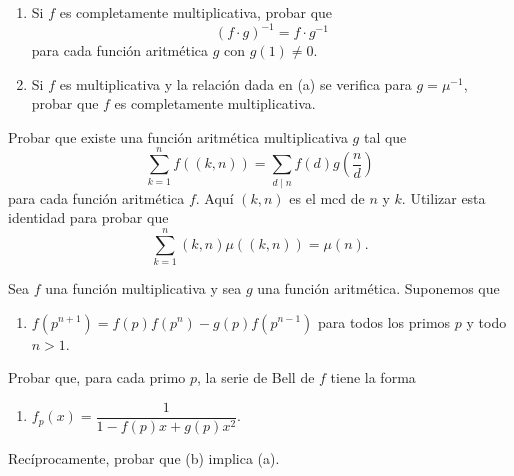 \documentclass[12pt,a4paper]{book}
\begin{document}
    \begin{ejercicio}
        \begin{enumerate}
            \item[(a)] Si $f$ es completamente multiplicativa, probar que
            \begin{equation*}
                (f\cdot g)^{-1}=f\cdot g^{-1}
            \end{equation*}
            para cada función aritmética $g$ con $g(1)\neq0$.
            \item[(b)] Si $f$ es multiplicativa y la relación dada en (a) se verifica para
            $g=\mu^{-1}$, probar que $f$ es completamente multiplicativa.
        \end{enumerate}
    \end{ejercicio}

    \begin{ejercicio}
        Probar que existe una función aritmética multiplicativa $g$ tal que
        \begin{equation*}
            \sum_{k=1}^{n}f((k,n))=\sum_{d\mid n}f(d)g\left(\frac{n}{d}\right)
        \end{equation*}
        para cada función aritmética $f$. Aquí $(k,n)$ es el mcd de $n$ y $k$. Utilizar
        esta identidad para probar que
        \begin{equation*}
            \sum_{k=1}^{n}(k,n)\mu((k,n))=\mu(n).
        \end{equation*}
    \end{ejercicio}

    \begin{ejercicio}
        Sea $f$ una función multiplicativa y sea $g$ una función aritmética. Suponemos que
        \begin{enumerate}
            \item[(a)] $f(p^{n+1})=f(p)f(p^{n})-g(p)f(p^{n-1})$ para todos los primos $p$ y
            todo $n>1$.
        \end{enumerate}
        Probar que, para cada primo $p$, la serie de Bell de $f$ tiene la forma
        \begin{enumerate}
            \item[(b)] $f_{p}(x)=\dfrac{1}{1-f(p)x+g(p)x^{2}}$.
        \end{enumerate}
        Recíprocamente, probar que (b) implica (a).
    \end{ejercicio}
\end{document}
